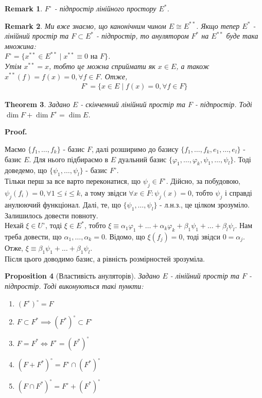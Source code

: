 \documentclass[a4paper, 10pt]{article}
\makeatletter
\theoremstyle{theoremdd}
\newtheorem{theorem}{Theorem}[subsection]
\newtheorem{proposition}[theorem]{Proposition}
\newtheorem{remark}[theorem]{Remark}
\renewenvironment{proof}[1][Proof.\\]{\par
\pushQED{\hfill \qed}%
\normalfont \topsep6\p@\@plus6\p@\relax
\trivlist
\item\relax
{\bfseries
#1\@addpunct{.}}\hspace\labelsep\ignorespaces
}{%
\popQED\endtrivlist\@endpefalse
}
\makeatother
\begin{document}
\begin{remark}
$F^\circ$ - підпростір лінійного простору $E^*$.
\end{remark}

\begin{remark}
Ми вже знаємо, що канонічним чином $E \cong E^{**}$. Якщо тепер $E^*$ - лінійний простір та $F \subset E^*$ - підпростір, то анулятором $F^{*}$ на $E^{**}$ буде така множина:\\
$F^\circ = \{ x^{**} \in E^{**} \mid x^{**} \equiv 0 \text{ на }F \}$.\\
Утім $x^{**} = x$, тобто це можна сприймати як $x \in E$, а також $x^{**}(f) = f(x) = 0, \forall f \in F$. Отже,
\begin{align*}
F^\circ = \{ x \in E \mid f(x) = 0, \forall f \in F \}
\end{align*}
\end{remark}

\begin{theorem}
Задано $E$ - скінченний лінійний простір та $F$ - підпростір. Тоді \\ $\dim F + \dim F^\circ = \dim E$.
\end{theorem}

\begin{proof}
Маємо $\{f_1,\dots,f_k\}$ - базис $F$, далі розширимо до базису $\{f_1,\dots,f_k,e_1,\dots,e_l\}$ - базис $E$. Для нього підбираємо в $E$ дуальний базис $\{\varphi_1,\dots,\varphi_k,\psi_1,\dots,\psi_l\}$. Тоді доведемо, що $\{\psi_1,\dots,\psi_l\}$ - базис $F^\circ$.
\bigskip \\
Тільки перш за все варто переконатися, що $\psi_j \in F^\circ$. Дійсно, за побудовою, $\psi_j(f_i) = 0, \forall 1 \leq i \leq k$, а тому звідси $\forall x \in F: \psi_j(x) = 0$, тобто $\psi_j$ і справді анулюючий функціонал. Далі, те, що $\{\psi_1,\dots,\psi_l\}$ - л.н.з., це цілком зрозуміло. Залишилось довести повноту.\\
Нехай $\xi \in U^\circ$, тоді $\xi \in E^*$, тобто $\xi \equiv \alpha_1 \varphi_1 + \dots + \alpha_k \varphi_k + \beta_1 \psi_1 + \dots + \beta_l \psi_l$. Нам треба довести, що $\alpha_1,\dots,\alpha_k = 0$. Відомо, що $\xi(f_j) = 0$, тоді звідси $0 = \alpha_j$. Отже, $\xi \equiv \beta_1 \psi_1 + \dots + \beta_1  \psi_l$.\\
Після цього доводимо базис, а рівність розмірностей зрозуміла.
\end{proof}

\begin{proposition}[Властивість ануляторів]
Задано $E$ - лінійний простір та $F$ - підпростір. Тоді виконуються такі пункти:
\begin{enumerate}[nosep, wide=0pt, label={\arabic*)}]
\item $(F^{\circ})^{\circ} = F$
\item $F \subset F^* \implies (F^*)^\circ \subset F^\circ$
\item $F = F^* \iff F^\circ = (F^*)^\circ$
\item $(F+F^*)^\circ = F^\circ \cap (F^*)^\circ$
\item $(F \cap F^*)^\circ = F^\circ + (F^*)^\circ$
\end{enumerate}
\end{proposition}
\end{document}
